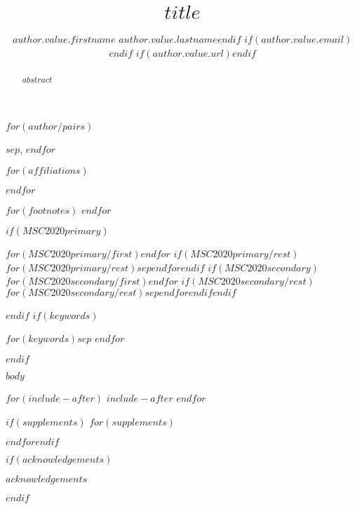 \documentclass[ba]{imsart}
\numberwithin{equation}{section}
\theoremstyle{plain}
\begin{document}
\begin{frontmatter}

\title{$title$}

\begin{aug}
$for(author/pairs)$
\author{$author.value.firstname$ $author.value.lastname$$endif$
$if(author.value.email)$$endif$
$if(author.value.url)$$endif$}$sep$, $endfor$


$for(affiliations)$ %
\address[$affiliations.ref$]{$affiliations.name$,$affiliations.address$ $for(author/pairs)$
$if(it.value.email)$
\ifstrequal{$affiliations.ref$}{$it.value.affiliationref$}{\printead{ea-$it.key$}}{}
$endif$
$if(it.value.url)$
\ifstrequal{$affiliations.ref$}{$it.value.affiliationref$}{\printead{ua-$it.key$}}{}
$endif$
$sep$ $endfor$%
}$endfor$%

$for(footnotes)$
$endfor$

\end{aug}

\begin{abstract}
$abstract$
\end{abstract}

$if(MSC2020primary)$ \begin{keyword}[class=MSC]
$for(MSC2020primary/first)$$endfor$
$if(MSC2020primary/rest)$$for(MSC2020primary/rest)$$sep $$endfor$$endif$
$if(MSC2020secondary)$$for(MSC2020secondary/first)$$endfor$
$if(MSC2020secondary/rest)$$for(MSC2020secondary/rest)$$sep $$endfor$$endif$$endif$\end{keyword}$endif$
$if(keywords)$ \begin{keyword} $for(keywords)$$sep$ $endfor$\end{keyword}$endif$
\end{frontmatter}

$body$

$for(include-after)$
$include-after$
$endfor$

$if(supplements)$
$for(supplements)$
\begin{supplement}
\end{supplement}
$endfor$$endif$

$if(acknowledgements)$
\begin{acks}[Acknowledgments]
$acknowledgements$
\end{acks}
$endif$



\end{document}
